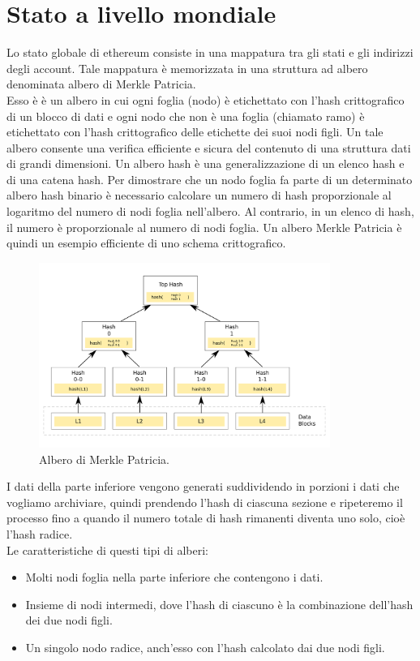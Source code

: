\documentclass[a4paper,11pt]{report}
\begin{document}
\section{Stato a livello mondiale}
Lo stato globale di ethereum consiste in una mappatura tra gli stati e gli indirizzi degli account. Tale mappatura è memorizzata in una struttura ad albero denominata albero di Merkle Patricia.\\
Esso è  è un albero in cui ogni foglia (nodo) è etichettato con l'hash crittografico di un blocco di dati e ogni nodo che non è una foglia (chiamato ramo) è etichettato con l'hash crittografico delle etichette dei suoi nodi figli. Un tale albero consente una verifica efficiente e sicura del contenuto di una struttura dati di grandi dimensioni. Un albero hash è una generalizzazione di un elenco hash e di una catena hash.
Per dimostrare che un nodo foglia fa parte di un determinato albero hash binario è necessario calcolare un numero di hash proporzionale al logaritmo del numero di nodi foglia nell'albero. Al contrario, in un elenco di hash, il numero è proporzionale al numero di nodi foglia. Un albero Merkle Patricia è quindi un esempio efficiente di uno schema crittografico.

\begin{figure}[htbp] 
\begin{center}
\includegraphics[width=9.5cm]{img/hs.png} 
\end{center}
\caption{Albero di Merkle Patricia.}
\end{figure}
\newpage
I dati della parte inferiore vengono generati suddividendo in porzioni i dati che vogliamo archiviare, quindi prendendo l'hash di ciascuna sezione e ripeteremo il processo fino a quando il numero totale di hash rimanenti diventa uno solo, cioè l'hash radice.\\
Le caratteristiche di questi tipi di alberi:
\begin{itemize}
\item Molti nodi foglia nella parte inferiore che contengono i dati.
\item Insieme di nodi intermedi, dove l'hash di ciascuno è la combinazione dell'hash dei due nodi figli.
\item Un singolo nodo radice, anch'esso con l'hash calcolato dai due nodi figli.
\end{itemize}
\end{document}
